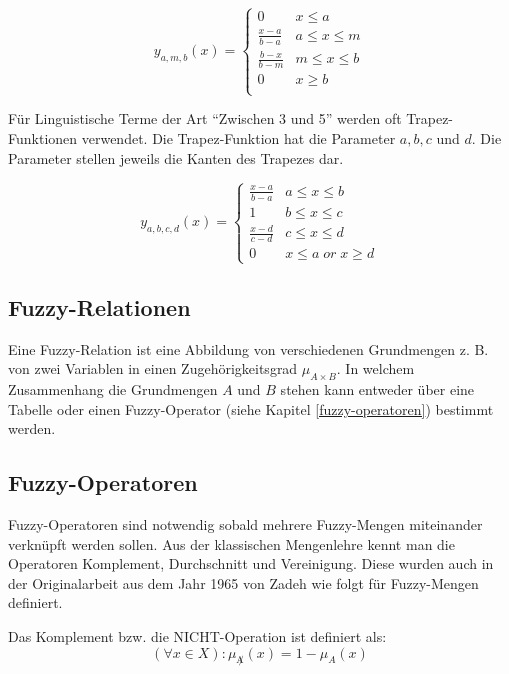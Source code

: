 \documentclass[12pt,a4paper,bibliography=totocnumbered,listof=totocnumbered, abstracton]{scrartcl}
\theoremstyle{Umgebung}
\begin{document}
\begin{equation}
y_{a,m,b}(x)=\begin{cases}
0				& x \leq a \\
\frac{x-a}{b-a} & a \leq x \leq m  \\
\frac{b-x}{b-m} & m \leq x \leq b  \\
0 				& x \geq b \\
\end{cases}
\end{equation}

Für Linguistische Terme der Art \enquote{Zwischen 3 und 5} werden oft Trapez-Funktionen verwendet. Die Trapez-Funktion hat die Parameter $a,b,c$ und $d$. Die Parameter stellen jeweils die Kanten des Trapezes dar.

\begin{equation}
y_{a,b,c,d}(x)=\begin{cases}
\frac{x-a}{b-a} & a \leq x \leq b  \\
1 				& b \leq x \leq c \\
\frac{x-d}{c-d} & c \leq x \leq d \\
0				& x \le a \; or \; x \ge d  
\end{cases}
\end{equation}

\subsection{Fuzzy-Relationen}

Eine Fuzzy-Relation ist eine Abbildung von verschiedenen Grundmengen z. B. von zwei Variablen in einen Zugehörigkeitsgrad $\mu_{A \times B}$. In welchem Zusammenhang die Grundmengen $A$ und $B$ stehen kann entweder über eine Tabelle oder einen Fuzzy-Operator (siehe Kapitel \ref{fuzzy-operatoren}) bestimmt werden.

\label{fuzzy-operatoren}
\subsection{Fuzzy-Operatoren}

Fuzzy-Operatoren sind notwendig sobald mehrere Fuzzy-Mengen miteinander verknüpft werden sollen. Aus der klassischen Mengenlehre kennt man die Operatoren Komplement, Durchschnitt und Vereinigung. Diese wurden auch in der Originalarbeit aus dem Jahr 1965 von Zadeh wie folgt für Fuzzy-Mengen definiert.

\begin{defnt}[Komplement]
	Das Komplement bzw. die NICHT-Operation ist definiert als: 
	\begin{equation}
		(\forall x \in X) : \mu_{\not A}( x) = 1 - \mu_A(x)
	\end{equation}
	
\end{defnt}
\end{document}
